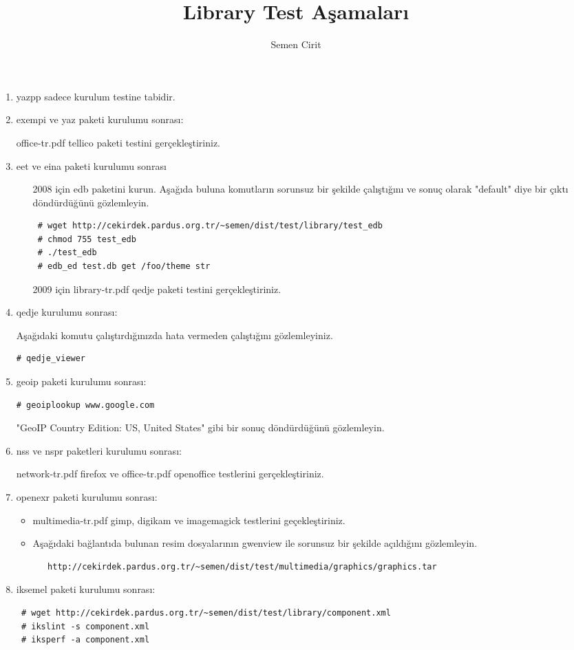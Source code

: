 \documentclass[a4paper,10pt]{article}
\title{Library Test Aşamaları}
\author{Semen Cirit}
\begin{document}
\maketitle
\begin{enumerate}
\item yazpp sadece kurulum testine tabidir.
\item exempi ve yaz paketi kurulumu sonrası:

office-tr.pdf tellico paketi testini gerçekleştiriniz.

\item eet ve eina paketi kurulumu sonrası
\begin{itemize}
 \item [2008 için] edb paketini kurun. Aşağıda buluna komutların sorunsuz bir şekilde çalıştığını ve sonuç olarak "default" diye bir çıktı döndürdüğünü gözlemleyin.
\begin{verbatim}
 # wget http://cekirdek.pardus.org.tr/~semen/dist/test/library/test_edb
 # chmod 755 test_edb
 # ./test_edb
 # edb_ed test.db get /foo/theme str
\end{verbatim}
\item [2009 için] library-tr.pdf qedje paketi testini gerçekleştiriniz.
\end{itemize}

\item qedje kurulumu sonrası:

Aşağıdaki komutu çalıştırdığınızda hata vermeden çalıştığını gözlemleyiniz.
\begin{verbatim}
# qedje_viewer
\end{verbatim}

\item geoip paketi kurulumu sonrası:
\begin{verbatim}
# geoiplookup www.google.com 
\end{verbatim}
"GeoIP Country Edition: US, United States" gibi bir sonuç döndürdüğünü gözlemleyin.

\item nss ve nspr paketleri kurulumu sonrası:

network-tr.pdf firefox ve office-tr.pdf openoffice testlerini gerçekleştiriniz.

\item openexr paketi kurulumu sonrası:
\begin{itemize}
 \item multimedia-tr.pdf gimp, digikam ve imagemagick testlerini geçekleştiriniz.
 \item Aşağıdaki bağlantıda bulunan resim dosyalarının gwenview ile sorunsuz bir şekilde açıldığını gözlemleyin.
  \begin{verbatim}
   http://cekirdek.pardus.org.tr/~semen/dist/test/multimedia/graphics/graphics.tar
  \end{verbatim}
\end{itemize}
\item iksemel paketi kurulumu sonrası:
\begin{verbatim}
 # wget http://cekirdek.pardus.org.tr/~semen/dist/test/library/component.xml
 # ikslint -s component.xml
 # iksperf -a component.xml 
\end{verbatim}


\end{enumerate}
\end{document}
